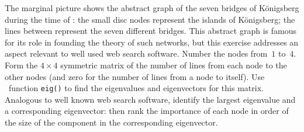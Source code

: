 \begin{exercise} \label{ex:} 
The marginal picture shows the abstract graph of the seven bridges of K\"onigsberg during the time of : the small disc nodes represent the islands of K\"onigsberg; the lines between represent the seven different bridges.
%
This abstract graph is famous for its role in founding the theory of such networks, but this exercise addresses an aspect relevant to well used web search software.
Number the nodes from~\(1\) to~\(4\).
Form the \(4\times 4\) symmetric matrix of the number of lines from each node to the other nodes (and zero for the number of lines from a node to itself).
Use \script\ function \verb|eig()| to find the eigenvalues and eigenvectors for this matrix.
Analogous to well known web search software, identify the largest eigenvalue and a corresponding eigenvector:  then rank the importance of each node in order of the size of the component in the corresponding eigenvector.
\end{exercise}



